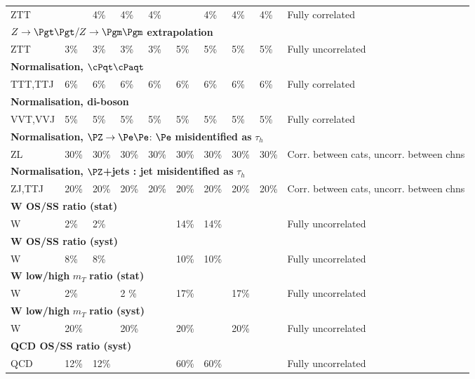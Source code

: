 \begin{table}[!h]
\begin{center}
{\begin{tabular}{p{2cm}|p{1cm}p{1cm}p{1cm}p{1cm}|p{1cm}p{1cm}p{1cm}p{1cm}|p{3cm}}
    ZTT         &  & 4\% & 4\% & 4\% &  & 4\% & 4\% & 4\% & Fully correlated              \\
   \multicolumn{10}{l}{ $Z\to\Pgt\Pgt/Z\to\Pgm\Pgm$\textbf{ extrapolation} } \\
    ZTT         & 3\% & 3\% & 3\% & 3\% & 5\% & 5\% & 5\% & 5\% & Fully uncorrelated           \\
    \multicolumn{10}{l}{\textbf{Normalisation,} $\cPqt\cPaqt$}\\
    TTT,TTJ     & 6\% & 6\% & 6\% & 6\%   & 6\% & 6\% &6\% & 6\%  & Fully correlated                \\
    \multicolumn{10}{l}{\textbf{Normalisation, di-boson} } \\
    VVT,VVJ     & 5\% & 5\% & 5\% & 5\%   & 5\% & 5\% & 5\% & 5\% & Fully correlated         \\
   \multicolumn{10}{l}{ \textbf{Normalisation,} $\PZ\to\Pe\Pe$: $\Pe$ \textbf{misidentified as} $\tau_{h}$ }\\
    ZL     & 30\%  & 30\% & 30\% & 30\%   & 30\% & 30\% & 30\% &30\% & Corr. between cats, uncorr. between chns       \\
    \multicolumn{10}{l}{\textbf{Normalisation,} $\PZ$\textbf{+jets : jet misidentified as} $\tau_{h}$ } \\
    ZJ,TTJ     & 20\%  & 20\% &20\% &20\%      & 20\% & 20\% &20\% &20\%  & Corr. between cats, uncorr. between chns       \\
    \hline
    \multicolumn{10}{l}{\textbf{W OS/SS ratio (stat) } } \\
    W & 2\% & 2\% & & &14\% &14\% & & & Fully uncorrelated \\
    \multicolumn{10}{l}{\textbf{W OS/SS ratio (syst) } }\\
    W & 8\% & 8\% & & &10\% &10\% & & &Fully uncorrelated \\
    \multicolumn{10}{l}{\textbf{W low/high} $m_{T}$ \textbf{ratio (stat)}}\\
    W & 2\% & & 2 \% & &17\% & & 17\% & & Fully uncorrelated \\
    \multicolumn{10}{l}{\textbf{W low/high} $m_{T}$ \textbf{ratio (syst)} }\\
    W & 20\% & &20\% & & 20\% & & 20\% & & Fully uncorrelated \\
    \multicolumn{10}{l}{\textbf{QCD OS/SS ratio (syst) }}\\
    QCD & 12\% & 12\% & & & 60\% & 60\% & & &Fully uncorrelated \\
    \hline
\end{tabular}
}
\label{tab:SystematicUncertainties_et}
\end{center}
\end{table}


